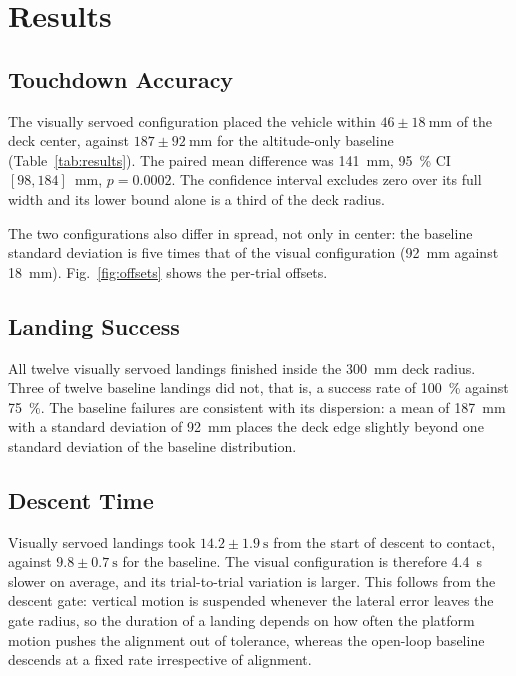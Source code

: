 \section{Results}

\subsection{Touchdown Accuracy}

The visually servoed configuration placed the vehicle within
$46 \pm \SI{18}{\milli\meter}$ of the deck center, against
$187 \pm \SI{92}{\milli\meter}$ for the altitude-only baseline
(Table~\ref{tab:results}). The paired mean difference was
\SI{141}{\milli\meter}, \SI{95}{\percent} CI $[98, 184]$~mm,
$p = 0.0002$. The confidence interval excludes zero over its full width and its
lower bound alone is a third of the deck radius.

The two configurations also differ in spread, not only in center: the baseline
standard deviation is five times that of the visual configuration
(\SI{92}{\milli\meter} against \SI{18}{\milli\meter}). Fig.~\ref{fig:offsets}
shows the per-trial offsets.

\subsection{Landing Success}

All twelve visually servoed landings finished inside the
\SI{300}{\milli\meter} deck radius. Three of twelve baseline landings did not,
that is, a success rate of \SI{100}{\percent} against \SI{75}{\percent}. The
baseline failures are consistent with its dispersion: a mean of
\SI{187}{\milli\meter} with a standard deviation of \SI{92}{\milli\meter} places
the deck edge slightly beyond one standard deviation of the baseline
distribution.

\subsection{Descent Time}

Visually servoed landings took $14.2 \pm \SI{1.9}{\second}$ from the start of
descent to contact, against $9.8 \pm \SI{0.7}{\second}$ for the baseline. The
visual configuration is therefore \SI{4.4}{\second} slower on average, and its
trial-to-trial variation is larger. This follows from the descent gate: vertical
motion is suspended whenever the lateral error leaves the gate radius, so the
duration of a landing depends on how often the platform motion pushes the
alignment out of tolerance, whereas the open-loop baseline descends at a fixed
rate irrespective of alignment.

